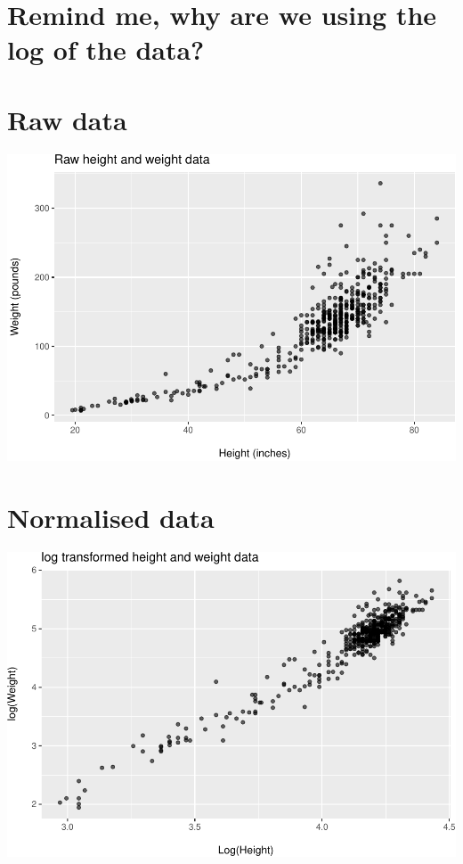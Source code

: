\documentclass[
]{article}
\begin{document}
\hypertarget{remind-me-why-are-we-using-the-log-of-the-data}{%
\section{Remind me, why are we using the log of the
data?}\label{remind-me-why-are-we-using-the-log-of-the-data}}

\hypertarget{raw-data}{%
\section{Raw data}\label{raw-data}}

\includegraphics{L8_Correlation_and_regression_pdf_files/figure-latex/unnamed-chunk-4-1.pdf}

\hypertarget{normalised-data}{%
\section{Normalised data}\label{normalised-data}}

\includegraphics{L8_Correlation_and_regression_pdf_files/figure-latex/unnamed-chunk-5-1.pdf}
\end{document}
